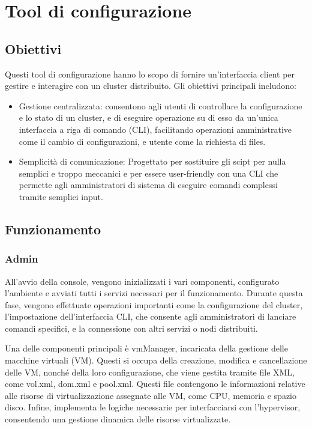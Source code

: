 \section{Tool di configurazione}
\subsection{Obiettivi}
Questi tool di configurazione hanno lo scopo di fornire un'interfaccia client 
per gestire e interagire con un cluster distribuito. Gli obiettivi principali includono:
\begin{itemize}
  \item Gestione centralizzata: consentono agli utenti di controllare la configurazione 
      e lo stato di un cluster, e di eseguire operazione su di esso da un'unica interfaccia 
        a riga di comando (CLI), facilitando operazioni 
  amministrative come il cambio di configurazioni, e utente come la richiesta di files.
  \item Semplicità di comunicazione: Progettato per sostituire gli scipt per nulla semplici 
      e troppo meccanici e per essere user-friendly con una CLI che permette agli amministratori 
        di sistema di eseguire comandi complessi tramite semplici input.
\end{itemize}


\subsection{Funzionamento}
\subsubsection{Admin}
All'avvio della console, vengono inizializzati i vari componenti, configurato l'ambiente e 
avviati tutti i servizi 
necessari per il funzionamento. Durante questa fase, vengono effettuate operazioni importanti 
come la configurazione del cluster, l'impostazione dell'interfaccia CLI, che consente agli 
amministratori di lanciare comandi specifici, e la connessione con altri servizi o nodi distribuiti.

Una delle componenti principali è vmManager, incaricata della gestione delle macchine virtuali (VM).
Questi si occupa della creazione, modifica e cancellazione delle VM, nonché della loro 
configurazione, che viene gestita tramite file XML, come vol.xml, dom.xml e pool.xml. 
Questi file contengono le informazioni relative alle risorse di virtualizzazione assegnate alle 
VM, come CPU, memoria e spazio disco. Infine, implementa le logiche necessarie per interfacciarsi 
con l'hypervisor, consentendo una gestione dinamica delle risorse virtualizzate.

